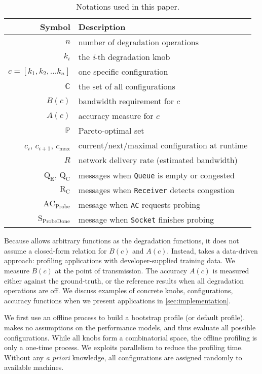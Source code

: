 \begin{table}
  \footnotesize
  \centering
  \begin{tabular}{r l}
    \toprule
    \textbf{Symbol} & \textbf{Description} \\
    \midrule
    $n$ & number of degradation operations \\
    $k_i$ & the \textit{i}-th degradation knob \\
    $c = [k_{1}, k_{2}, ... k_{n}]$ & one specific configuration \\
    $\mathbb{C}$ & the set of all configurations \\
    \midrule
    $B(c)$ & bandwidth requirement for $c$ \\
    $A(c)$ & accuracy measure for $c$ \\
    $\mathbb{P}$ & Pareto-optimal set \\
    \midrule
    $c_i$, $c_{i+1}$, $c_{\max}$ & current/next/maximal configuration at runtime \\
    $R$ & network delivery rate (estimated bandwidth) \\
    $\text{Q}_\text{E}$, $\text{Q}_\text{C}$ & messages when \texttt{Queue} is empty or congested \\
    $\text{R}_\text{C}$ & messages when \texttt{Receiver} detects congestion \\
    $\text{AC}_\text{Probe}$ & message when \texttt{AC} requests probing \\
    $\text{S}_\text{ProbeDone}$ & message when \texttt{Socket} finishes probing \\
    \bottomrule
  \end{tabular}
  \caption{Notations used in this paper.}
  \label{tab:notations}
\end{table}

Because \sysname{} allows arbitrary functions as the degradation functions, it
does not assume a closed-form relation for $B(c)$ and $A(c)$. Instead,
\sysname{} takes a data-driven approach: profiling applications with
developer-supplied training data.  We measure $B(c)$ at the point of
transmission. The accuracy $A(c)$ is measured either against the ground-truth,
or the reference results when all degradation operations are off.  We discuss
examples of concrete knobs, configurations, accuracy functions when we present
applications in \autoref{sec:implementation}.

 We first use an offline process to build a bootstrap
profile (or default profile).  \sysname{} makes no assumptions on the
performance models, and thus evaluate all possible configurations.  While all
knobs form a combinatorial space, the offline profiling is only a one-time
process.  We exploits parallelism to reduce the profiling time.  Without any
\textit{a priori} knowledge, all configurations are assigned randomly to
available machines.

